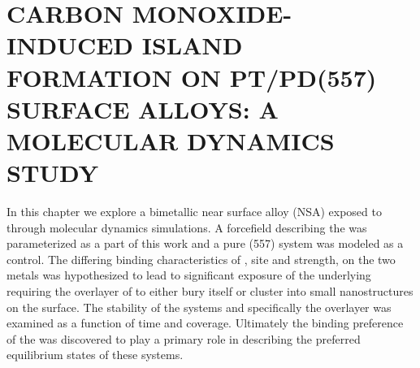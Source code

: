 
\chapter{CARBON MONOXIDE-INDUCED ISLAND FORMATION ON PT/PD(557) SURFACE ALLOYS: A MOLECULAR DYNAMICS STUDY}
\label{chap:island}




In this chapter we explore a bimetallic  near surface alloy (NSA)
exposed to  through molecular dynamics simulations. A forcefield
describing the  was parameterized as a part of this work and
a pure  (557) system was modeled as a control. The differing binding
characteristics of , site and strength, on the two metals was
hypothesized to lead to significant exposure of the underlying 
requiring the overlayer of  to either bury itself or cluster into small
nanostructures on the surface. The stability of the systems and specifically
the  overlayer was examined as a function of time and  coverage.
Ultimately the binding preference of the  was discovered to play a
primary role in describing the preferred equilibrium states of these systems.



